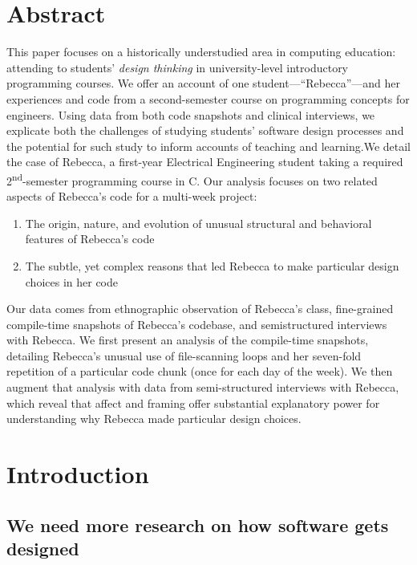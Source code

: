 \raggedright{}

\section{Abstract}\label{abstract}

This paper focuses on a historically understudied area in computing education: attending to students' \emph{design thinking} in university-level introductory programming courses. We offer an account of one student---``Rebecca''---and her experiences and code from a second-semester course on programming concepts for engineers. Using data from both code snapshots and clinical interviews, we explicate both the challenges of studying students' software design processes and the potential for such study to inform accounts of teaching and learning.We detail the case of Rebecca, a first-year Electrical Engineering student taking a required 2\textsuperscript{nd}-semester programming course in C. Our analysis focuses on two related aspects of Rebecca's code for a multi-week project:

\begin{enumerate}
\def\labelenumi{\arabic{enumi}.}
\tightlist
\item
  The origin, nature, and evolution of unusual structural and behavioral features of Rebecca's code
\item
  The subtle, yet complex reasons that led Rebecca to make particular design choices in her code
\end{enumerate}

Our data comes from ethnographic observation of Rebecca's class, fine-grained compile-time snapshots of Rebecca's codebase, and semistructured interviews with Rebecca. We first present an analysis of the compile-time snapshots, detailing Rebecca's unusual use of file-scanning loops and her seven-fold repetition of a particular code chunk (once for each day of the week). We then augment that analysis with data from semi-structured interviews with Rebecca, which reveal that affect \citep{hannula_affect_2004, eynde_case_2006} and framing \citep{vandesande_achieving_2012, hammer_resources_2005} offer substantial explanatory power for understanding why Rebecca made particular design choices.

\section{Introduction}\label{introduction}

\subsection{We need more research on how software gets designed}\label{we-need-more-research-on-how-software-gets-designed}


